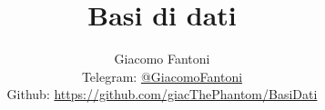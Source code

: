 
\title{\Huge \textbf{Basi di dati}}
\author{
  Giacomo Fantoni \\
  \small Telegram: \href{https://t.me/GiacomoFantoni}{@GiacomoFantoni} \\[3pt]
  \small Github: \href{https://github.com/giacThePhantom/BasiDati}{https://github.com/giacThePhantom/BasiDati}}

\maketitle
\tableofcontents











